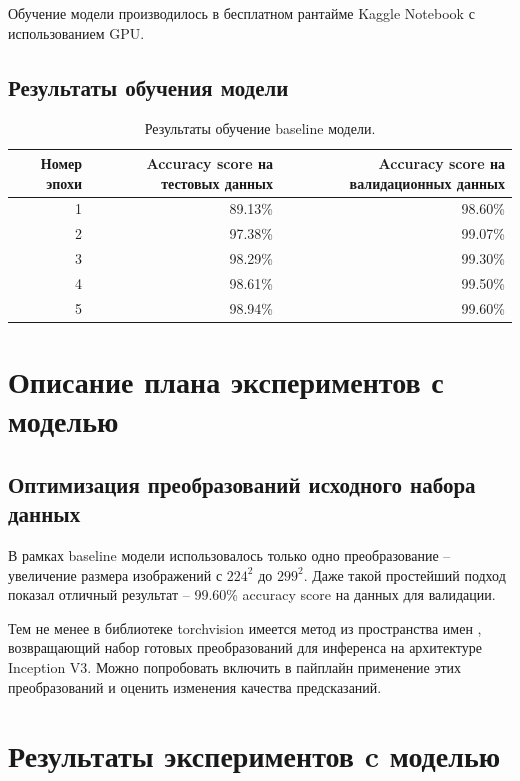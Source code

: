 \documentclass[a4paper,12pt]{extarticle}
\begin{document}
Обучение модели производилось в бесплатном рантайме Kaggle Notebook с использованием GPU.

\subsection{Результаты обучения модели}

\begin{table}[ht]
	\caption{Результаты обучение baseline модели.}
	\label{table:baseline_by_epoch}
	\footnotesize
	\centering
	\begin{tabular}{ |r|r|r| }
		\hline
		Номер эпохи & Accuracy score на тестовых данных & Accuracy score на валидационных данных \\ [0.5ex]
		\hline\hline
		1 & 89.13\% & 98.60\% \\
		\hline
		2 & 97.38\% & 99.07\% \\
		\hline
		3 & 98.29\% & 99.30\% \\
		\hline
		4 & 98.61\% & 99.50\% \\
		\hline
		5 & 98.94\% & 99.60\% \\
		\hline
	\end{tabular}
\end{table}

\newpage
\section{Описание плана экспериментов с моделью}

\subsection{Оптимизация преобразований исходного набора данных}

В рамках baseline модели использовалось только одно преобразование – увеличение размера изображений
с $224^2$ до $299^2$. Даже такой простейший подход показал отличный результат – 99.60\% accuracy
score на данных для валидации.

Тем не менее в библиотеке torchvision имеется метод  из
пространства имен ,
возвращающий набор готовых преобразований для инференса на архитектуре Inception V3. Можно попробовать
включить в пайплайн применение этих преобразований и оценить изменения качества предсказаний.

\newpage
\section{Результаты экспериментов c моделью}
\end{document}

